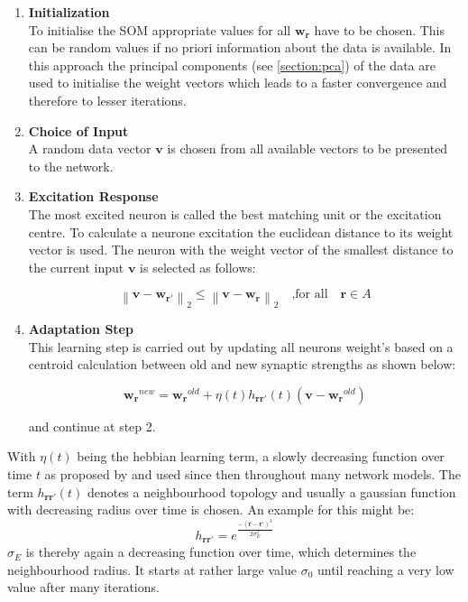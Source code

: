 \documentclass[cic,tc,english]{iiufrgs}
\newcommand{\norm}[1]{\left\lVert #1 \right\rVert_{2}}
\begin{document}
\begin{enumerate}
\item \textbf{Initialization} \\ To initialise the SOM appropriate values for all $\bm{w_r}$ have to be chosen. This can be random values if no priori information about the data is available. In this approach the principal components (see \ref{section:pca}) of the data are used to initialise the weight vectors which leads to a faster convergence and therefore to lesser iterations.

\item \textbf{Choice of Input} \\ A random data vector $\bm{v}$ is chosen from all available vectors to be presented to the network.

\item \textbf{Excitation Response} \\ The most excited neuron is called the best matching unit or the excitation centre. To calculate a neurone excitation the euclidean distance to its weight vector is used. The neuron with the weight vector of the smallest distance to the current input $\bm{v}$ is selected as follows:

\begin{equation}
 \norm{\bm{v} - \bm{w_{r'}}} \leq \norm{\bm{v} - \bm{w_r}} \quad \text{,for all} \quad \bm{r} \in A 
\end{equation}

\item \textbf{Adaptation Step} \\ This learning step is carried out by updating all neurons weight's based on a centroid calculation between old and new synaptic strengths as shown below:

\begin{equation}
\bm{w_r}^{new} = \bm{w_r}^{old} + \eta(t) h_{\bm{rr'}}(t)(\bm{v} - \bm{w_r}^{old})
\end{equation}

and continue at step 2.

\end{enumerate}
With $\eta(t)$ being the hebbian learning term, a slowly decreasing function over time $t$ as proposed by \cite{hebb2005organization} and used since then throughout many network models. The term $h_{\bm{rr'}}(t)$ denotes a neighbourhood topology and usually a gaussian function with decreasing radius over time is chosen. An example for this might be:
\begin{equation}
h_{\bm{rr'}} = e^{ \frac{-(\bm{r}-\bm{r'})^2}{2\sigma_{E}^2} }
\end{equation}
$\sigma_E$ is thereby again a decreasing function over time, which determines the neighbourhood radius. It starts at rather large value $\sigma_0$ until reaching a very low value after many iterations.
\end{document}
